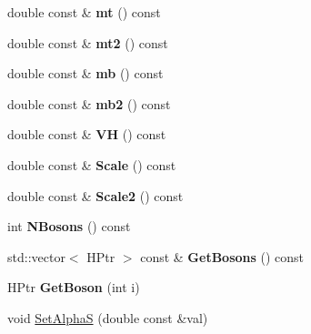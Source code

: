 \begin{DoxyCompactItemize}
\item 
\hypertarget{classHiggsModel_a913923ce15ea38a8a1576ea9e5d23d10}{double const \& {\bfseries mt} () const }\label{classHiggsModel_a913923ce15ea38a8a1576ea9e5d23d10}

\item 
\hypertarget{classHiggsModel_ad0685a0848a95342b272147317948d10}{double const \& {\bfseries mt2} () const }\label{classHiggsModel_ad0685a0848a95342b272147317948d10}

\item 
\hypertarget{classHiggsModel_a8ec3f6255ab720fb08a94937d436cdea}{double const \& {\bfseries mb} () const }\label{classHiggsModel_a8ec3f6255ab720fb08a94937d436cdea}

\item 
\hypertarget{classHiggsModel_a33ea2c639935f9971bdca5e5994325ff}{double const \& {\bfseries mb2} () const }\label{classHiggsModel_a33ea2c639935f9971bdca5e5994325ff}

\item 
\hypertarget{classHiggsModel_a9711ab1e2b584f86d75f6e53b9a35822}{double const \& {\bfseries V\-H} () const }\label{classHiggsModel_a9711ab1e2b584f86d75f6e53b9a35822}

\item 
\hypertarget{classHiggsModel_af679483d403b1d8b2f291542215fa0bd}{double const \& {\bfseries Scale} () const }\label{classHiggsModel_af679483d403b1d8b2f291542215fa0bd}

\item 
\hypertarget{classHiggsModel_a2572b90895176763db5cbbb3233ec242}{double const \& {\bfseries Scale2} () const }\label{classHiggsModel_a2572b90895176763db5cbbb3233ec242}

\item 
\hypertarget{classHiggsModel_a08c33da1ef0b46ed04dd5f1f9f84ae9a}{int {\bfseries N\-Bosons} () const }\label{classHiggsModel_a08c33da1ef0b46ed04dd5f1f9f84ae9a}

\item 
\hypertarget{classHiggsModel_a56909ae8843fbd15bc54df272e1a245d}{std\-::vector$<$ H\-Ptr $>$ const \& {\bfseries Get\-Bosons} () const }\label{classHiggsModel_a56909ae8843fbd15bc54df272e1a245d}

\item 
\hypertarget{classHiggsModel_afa9a44f6a2bd358d887acd5771253953}{H\-Ptr {\bfseries Get\-Boson} (int i)}\label{classHiggsModel_afa9a44f6a2bd358d887acd5771253953}

\item 
\hypertarget{classHiggsModel_a5a3f7171856b2106141948544fc49f13}{void \hyperlink{classHiggsModel_a5a3f7171856b2106141948544fc49f13}{Set\-Alpha\-S} (double const \&val)}\label{classHiggsModel_a5a3f7171856b2106141948544fc49f13}


\end{DoxyCompactItemize}

